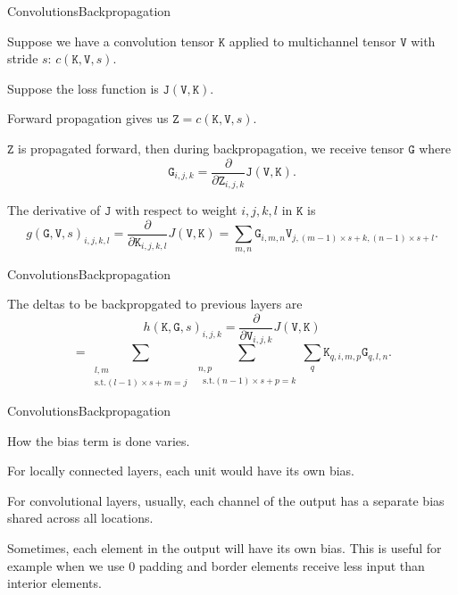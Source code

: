 \documentclass[aspectratio=169]{beamer}
\newcommand{\mat}[1]{\mathtt{#1}}
\begin{document}
\begin{frame}{Convolutions}{Backpropagation}

Suppose we have a convolution tensor $\mat{K}$ applied to multichannel
tensor $\mat{V}$ with stride $s$: $c(\mat{K},\mat{V},s)$.

\medskip

Suppose the loss function is $\mat{J}(\mat{V},\mat{K})$.

\medskip

Forward propagation gives us $\mat{Z} = c(\mat{K},\mat{V},s)$.

\medskip

$\mat{Z}$ is propagated forward, then during backpropagation, we
receive tensor $\mat{G}$ where
$$\mat{G}_{i,j,k} = \frac{\partial}{\partial \mat{Z}_{i,j,k}}
\mat{J}(\mat{V},\mat{K}) .$$

The derivative of $\mat{J}$ with respect to weight $i,j,k,l$ in $\mat{K}$
is
$$ g(\mat{G},\mat{V},s)_{i,j,k,l} = \frac{\partial}{\partial \mat{K}_{i,j,k,l}}
J(\mat{V},\mat{K}) =
\sum_{m,n} \mat{G}_{i,m,n} \mat{V}_{j,(m-1)\times s+k,(n-1)\times s + l}.$$

\end{frame}


\begin{frame}{Convolutions}{Backpropagation}

The deltas to be backpropgated to previous layers are
$$h(\mat{K},\mat{G},s)_{i,j,k} = \frac{\partial}{\partial \mat{V}_{i,j,k}}
J(\mat{V},\mat{K})$$
$$= \sum_{\substack{l,m\\ \textrm{s.t.} (l-1)\times s + m = j}}
\sum_{\substack{n,p\\ \;\; \textrm{s.t.} (n-1)\times s + p = k}}
\sum_q \mat{K}_{q,i,m,p} \mat{G}_{q,l,n}.$$

\end{frame}


\begin{frame}{Convolutions}{Backpropagation}

  How the bias term is done varies.

  \medskip

  For locally connected layers, each
  unit would have its own bias.

  \medskip

  For convolutional layers, usually, each channel of the output has a
  separate bias shared across all locations.

  \medskip

  Sometimes, each element in the output will have its own bias. This
  is useful for example when we use 0 padding and border elements
  receive less input than interior elements.

\end{frame}
\end{document}
